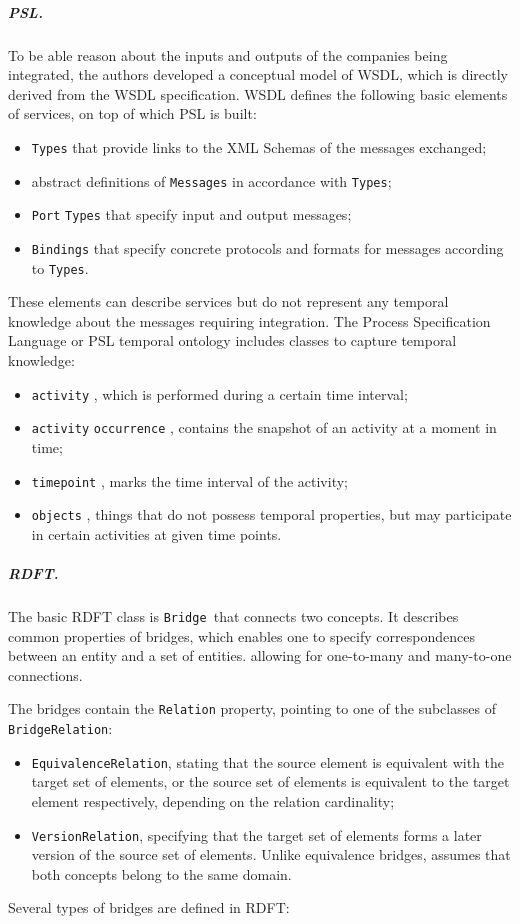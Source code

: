 \subparagraph{PSL.}
To be able reason about the inputs and outputs of the companies being
integrated, the authors developed a conceptual model of WSDL, which is
directly derived from the WSDL specification. WSDL defines the
following basic elements of services, on top of which PSL is built: 

\begin{itemize}
\item \texttt{Types} that provide links to the XML Schemas
of the messages exchanged; 
\item abstract definitions of \texttt{Messages} in
accordance with \texttt{Types}; 
\item \texttt{Port} \texttt{Types} that
specify input and output messages; 
\item \texttt{Bindings} that specify concrete protocols and
formats for messages according to \texttt{Types}. 
\end{itemize}
These elements can describe services but do not represent any temporal
knowledge about the messages requiring integration. The Process
Specification Language or PSL temporal ontology includes classes to
capture temporal knowledge: 

\begin{itemize}
\item \texttt{activity} , which is performed during a
certain time interval; 
\item \texttt{activity} \texttt{occurrence} ,
contains the snapshot of an activity at a moment in time; 
\item \texttt{timepoint} , marks the time interval of the
activity; 
\item \texttt{objects} , things that do not possess
temporal properties, but may participate in certain activities at given
time points. 
\end{itemize}
\subparagraph{RDFT.}
The basic RDFT class is \texttt{Bridge }that connects two
concepts. It describes common properties of bridges, which enables one
to specify correspondences between an entity and a set of entities.
allowing for one-to-many and many-to-one connections. 

The bridges contain the \texttt{Relation} property,
pointing to one of the subclasses of
\texttt{BridgeRelation}: 

\begin{itemize}
\item \texttt{EquivalenceRelation}, stating that the source
element is equivalent with the target set of elements, or the source
set of elements is equivalent to the target element respectively,
depending on the relation cardinality; 
\item \texttt{VersionRelation}, specifying that the target
set of elements forms a later version of the source set of elements.
Unlike equivalence bridges, assumes that both concepts belong to the
same domain. 
\end{itemize}
Several types of bridges are defined in RDFT: 

